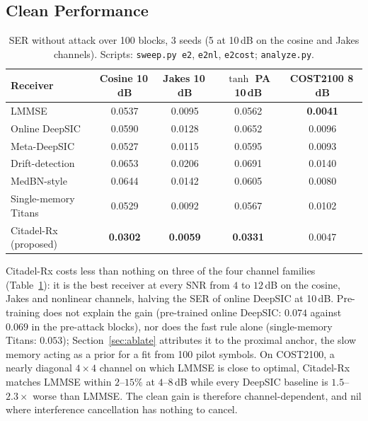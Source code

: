\documentclass[journal]{IEEEtran}
\begin{document}
\subsection{Clean Performance}\label{sec:clean}
\begin{table}[t]
\centering\caption{SER without attack over 100 blocks, 3 seeds (5 at 10\,dB on the cosine
and Jakes channels). Scripts: \texttt{sweep.py e2}, \texttt{e2nl}, \texttt{e2cost};
\texttt{analyze.py}.}\label{tab:clean}
\scriptsize
\begin{tabular}{@{}lcccc@{}}
\toprule
Receiver & Cosine 10\,dB & Jakes 10\,dB & $\tanh$ PA 10\,dB & COST2100 8\,dB\\
\midrule
LMMSE & 0.0537 & 0.0095 & 0.0562 & \textbf{0.0041}\\
Online DeepSIC & 0.0590 & 0.0128 & 0.0652 & 0.0096\\
Meta-DeepSIC & 0.0527 & 0.0115 & 0.0595 & 0.0093\\
Drift-detection & 0.0653 & 0.0206 & 0.0691 & 0.0140\\
MedBN-style & 0.0644 & 0.0142 & 0.0605 & 0.0080\\
Single-memory Titans & 0.0529 & 0.0092 & 0.0567 & 0.0102\\
Citadel-Rx (proposed) & \textbf{0.0302} & \textbf{0.0059} & \textbf{0.0331} & 0.0047\\
\bottomrule
\end{tabular}
\end{table}
Citadel-Rx costs less than nothing on three of the four channel families
(Table~\ref{tab:clean}): it is the best receiver at every SNR from $4$ to $12$\,dB on the cosine, Jakes and nonlinear
channels, halving the SER of online DeepSIC at 10\,dB. Pre-training does not explain the gain (pre-trained online
DeepSIC: $0.074$ against $0.069$ in the pre-attack blocks), nor does the fast rule alone
(single-memory Titans: $0.053$); Section~\ref{sec:ablate} attributes it to the proximal
anchor, the slow memory acting as a prior for a fit from 100 pilot symbols. On COST2100, a nearly diagonal $4\times4$ channel on which LMMSE
is close to optimal, Citadel-Rx matches LMMSE within $2$--$15\%$ at $4$--$8$\,dB while
every DeepSIC baseline is $1.5$--$2.3\times$ worse than LMMSE. The clean gain is therefore
channel-dependent, and nil where interference cancellation has nothing to cancel.
\end{document}
